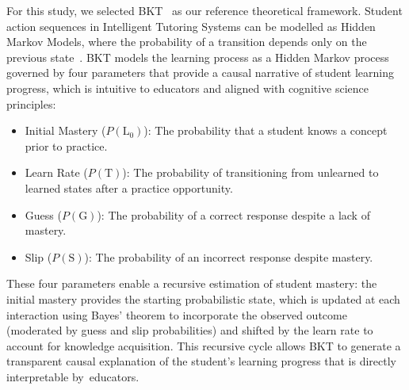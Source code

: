 \documentclass[applsci,article,accept,moreauthors,pdftex]{Definitions/mdpi}
\begin{document}
For this study, we selected BKT~\citep{corbett1994knowledge} as our reference theoretical framework. Student action sequences in Intelligent Tutoring Systems can be modelled as Hidden Markov Models, where the probability of a transition depends only on the previous state~\citep{Arnau-Gonzalez2025195}. BKT models the learning process as a Hidden Markov process governed by four parameters that provide a causal narrative of student learning progress, which is intuitive to educators and aligned with cognitive science principles:

\begin{itemize}
    \item Initial Mastery ($P(\text{L}_0)$): The probability that a student knows a concept prior to practice. %
    \item Learn Rate ($P(\text{T})$): %
    The probability of transitioning from unlearned to learned states after a practice opportunity.
    \item Guess ($P(\text{G})$): The probability of a correct response despite a lack of mastery.
    \item Slip ($P(\text{S})$): The probability of an incorrect response despite mastery. 
\end{itemize}

These four parameters enable a recursive estimation of student mastery: the initial mastery provides the starting probabilistic state, which is updated at each interaction using Bayes' theorem to incorporate the observed outcome (moderated by guess and slip probabilities) and shifted by the learn rate to account for knowledge acquisition. This recursive cycle allows BKT to generate a transparent causal explanation of the student's learning progress that is directly interpretable by~educators.
\end{document}

